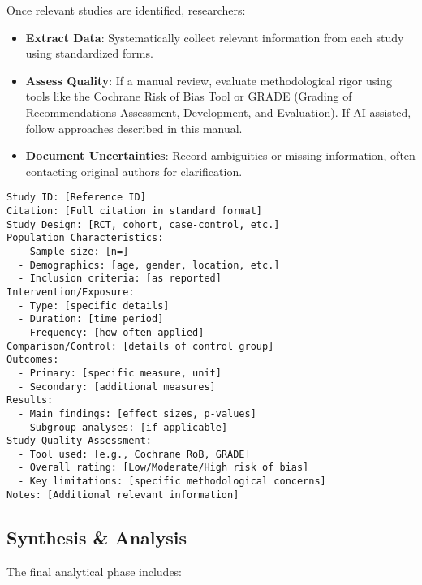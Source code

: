 Once relevant studies are identified, researchers:

\begin{itemize}
    \item \textbf{Extract Data}: Systematically collect relevant information from each study using standardized forms.
    \item \textbf{Assess Quality}: If a manual review, evaluate methodological rigor using tools like the Cochrane Risk of Bias Tool or GRADE (Grading of Recommendations Assessment, Development, and Evaluation). If AI-assisted, follow approaches described in this manual.
    \item \textbf{Document Uncertainties}: Record ambiguities or missing information, often contacting original authors for clarification.
\end{itemize}

\begin{infobox}
\begin{lstlisting}
Study ID: [Reference ID]
Citation: [Full citation in standard format]
Study Design: [RCT, cohort, case-control, etc.]
Population Characteristics:
  - Sample size: [n=]
  - Demographics: [age, gender, location, etc.]
  - Inclusion criteria: [as reported]
Intervention/Exposure:
  - Type: [specific details]
  - Duration: [time period]
  - Frequency: [how often applied]
Comparison/Control: [details of control group]
Outcomes:
  - Primary: [specific measure, unit]
  - Secondary: [additional measures]
Results:
  - Main findings: [effect sizes, p-values]
  - Subgroup analyses: [if applicable]
Study Quality Assessment:
  - Tool used: [e.g., Cochrane RoB, GRADE]
  - Overall rating: [Low/Moderate/High risk of bias]
  - Key limitations: [specific methodological concerns]
Notes: [Additional relevant information]
\end{lstlisting}
\end{infobox}

\subsection{Synthesis \& Analysis}

The final analytical phase includes:

